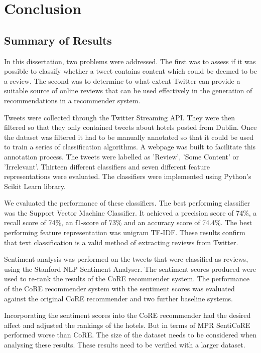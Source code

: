 \chapter{Conclusion}

\section{Summary of Results}

In this dissertation, two problems were addressed. The first was to assess if it was possible to classify whether a tweet contains content which could be deemed to be a review. The second was to determine to what extent Twitter can provide a suitable source of online reviews that can be used effectively in the generation of recommendations in a recommender system.

Tweets were collected through the Twitter Streaming API. They were then filtered so that they only contained tweets about hotels posted from Dublin. Once the dataset was filtered it had to be manually annotated so that it could be used to train a series of classification algorithms. A webpage was built to facilitate this annotation process. The tweets were labelled as 'Review', 'Some Content' or 'Irrelevant'. Thirteen different classifiers and seven different feature representations were evaluated. The classifiers were implemented using Python's Scikit Learn library.

We evaluated the performance of these classifiers. The best performing classifier was the Support Vector Machine Classifier. It achieved a precision score of 74\%, a recall score of 74\%, an f1-score of 73\% and an accuracy score of 74.4\%. The best performing feature representation was unigram TF-IDF. These results confirm that text classification is a valid method of extracting reviews from Twitter. 

Sentiment analysis was performed on the tweets that were classified as reviews, using the Stanford NLP Sentiment Analyser. The sentiment scores produced were used to re-rank the results of the CoRE recommender system. The performance of the CoRE recommender system with the sentiment scores was evaluated against the original CoRE recommender and two further baseline systems.

Incorporating the sentiment scores into the CoRE recommender had the desired affect and adjusted the rankings of the hotels. But in terms of MPR SentiCoRE performed worse than CoRE. The size of the dataset needs to be considered when analysing these results. These results need to be verified with a larger dataset.


